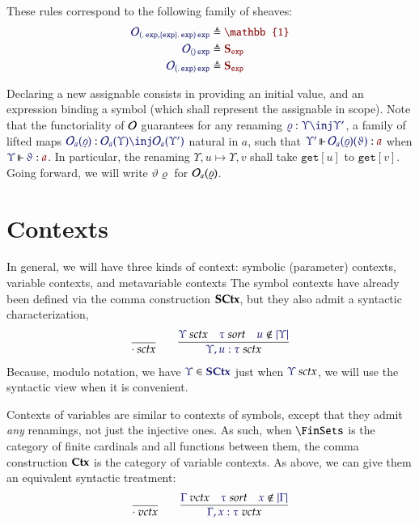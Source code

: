 \documentclass[11pt]{article}
\theoremstyle{definition}
\theoremstyle{remark}
\numberwithin{equation}{section}
\newcommand\SortExp{\mathtt{exp}}
\begin{document}
These rules correspond to the following family of sheaves:
\begin{align*}
  \ADefine{
    \Operators_{
      \MkArity{
        \MkValence{}{}{\SortExp},
        \MkValence{\SortExp}{}{\SortExp}
      }{
        \SortExp
      }
    }
  }{
    \mathbb{1}
  }\\
  \ADefine{
    \Operators_{
      \MkArity{}{\SortExp}
    }
  }{
    \mathbf{S}_\SortExp
  }\\
  \ADefine{
    \Operators_{
      \MkArity{
        \MkValence{}{}{\SortExp}
      }{
        \SortExp
      }
    }
  }{
    \mathbf{S}_\SortExp
  }
\end{align*}

Declaring a new assignable consists in providing an initial value, and an
expression binding a symbol (which shall represent the assignable in scope).
Note that the functoriality of $\mathcal{O}$ guarantees for any renaming
$\Of{\varrho}{\Upsilon\inj\Upsilon'}$, a family of lifted maps
$\Of{\Operators_a(\varrho)}{\Operators_a(\Upsilon)\inj\Operators_a(\Upsilon')}$
natural in $a$, such that
$\IsOperator{\Upsilon'}{\Operators_a(\varrho)(\vartheta)}{a}$ when
$\IsOperator{\Upsilon}{\vartheta}{a}$. In particular, the renaming
$\Upsilon,u\mapsto\Upsilon,v$ shall take $\mathtt{get}[u]$ to
$\mathtt{get}[v]$. Going forward, we will write $\vartheta\varrho$ for
$\mathcal{O}_a(\varrho)$.


\section{Contexts}

In general, we will have three kinds of context: symbolic (parameter) contexts,
variable contexts, and metavariable contexts The symbol contexts have already
been defined via the comma construction $\mathbf{SCtx}$, but they also admit a
syntactic characterization,
\begin{gather*}
  \infer{
    \IsSymCtx{\cdot}
  }{
  }
\qquad
  \infer{
    \IsSymCtx{\Upsilon,u:\tau}
  }{
    \IsSymCtx{\Upsilon}
&
    \IsSort{\tau}
&
    \NotIn{u}{\Dom\Upsilon}
  }
\end{gather*}
%
Because, modulo notation, we have $\Member{\Upsilon}{\SCtx}$ just when
$\IsSymCtx{\Upsilon}$, we will use the syntactic view when it is convenient.

Contexts of variables are similar to contexts of symbols, except that they
admit \emph{any} renamings, not just the injective ones. As such, when
$\FinSets$ is the category of finite cardinals and all functions between them, the
comma construction $\mathbf{Ctx}$ is the category of variable contexts. As above, we
can give them an equivalent syntactic treatment:
\begin{gather*}
  \infer{
    \IsVarCtx{\cdot}
  }{
  }
\qquad
  \infer{
    \IsVarCtx{\Gamma,x:\tau}
  }{
    \IsVarCtx{\Gamma}
&
    \IsSort{\tau}
&
    \NotIn{x}{\Dom\Gamma}
  }
\end{gather*}
\end{document}
